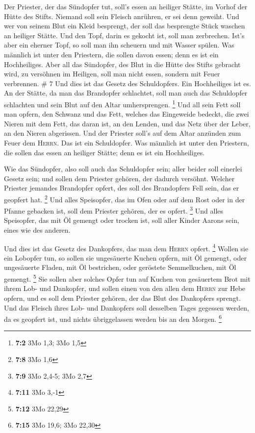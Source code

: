  Der Priester, der das Sündopfer tut, soll's essen an
heiliger Stätte, im Vorhof der Hütte des Stifts.  Niemand
soll sein Fleisch anrühren, er sei denn geweiht. Und wer von seinem Blut
ein Kleid besprengt, der soll das besprengte Stück waschen an heiliger
Stätte.  Und den Topf, darin es gekocht ist, soll man
zerbrechen. Ist's aber ein eherner Topf, so soll man ihn scheuern und
mit Wasser spülen.  Was männlich ist unter den Priestern,
die sollen davon essen; denn es ist ein Hochheiliges. 
Aber all das Sündopfer, des Blut in die Hütte des Stifts gebracht wird,
zu versöhnen im Heiligen, soll man nicht essen, sondern mit Feuer
verbrennen. \# 7  Und dies ist das Gesetz des
Schuldopfers. Ein Hochheiliges ist es.  An der Stätte, da
man das Brandopfer schlachtet, soll man auch das Schuldopfer schlachten
und sein Blut auf den Altar umhersprengen. \footnote{\textbf{7:2} 3Mo
  1,3; 3Mo 1,5}  Und all sein Fett soll man opfern, den
Schwanz und das Fett, welches das Eingeweide bedeckt,  die
zwei Nieren mit dem Fett, das daran ist, an den Lenden, und das Netz
über der Leber, an den Nieren abgerissen.  Und der
Priester soll's auf dem Altar anzünden zum Feuer dem \textsc{Herrn}. Das
ist ein Schuldopfer.  Was männlich ist unter den
Priestern, die sollen das essen an heiliger Stätte; denn es ist ein
Hochheiliges.

 Wie das Sündopfer, also soll auch das Schuldopfer sein;
aller beider soll einerlei Gesetz sein; und sollen dem Priester gehören,
der dadurch versöhnt.  Welcher Priester jemandes
Brandopfer opfert, des soll des Brandopfers Fell sein, das er geopfert
hat. \footnote{\textbf{7:8} 3Mo 1,6}  Und alles
Speisopfer, das im Ofen oder auf dem Rost oder in der Pfanne gebacken
ist, soll dem Priester gehören, der es opfert. \footnote{\textbf{7:9}
  3Mo 2,4-5; 3Mo 2,7}  Und alles Speisopfer, das mit Öl
gemengt oder trocken ist, soll aller Kinder Aarons sein, eines wie des
anderen.

 Und dies ist das Gesetz des Dankopfers, das man dem
\textsc{Herrn} opfert. \footnote{\textbf{7:11} 3Mo 3,-1} 
Wollen sie ein Lobopfer tun, so sollen sie ungesäuerte Kuchen opfern,
mit Öl gemengt, oder ungesäuerte Fladen, mit Öl bestrichen, oder
geröstete Semmelkuchen, mit Öl gemengt. \footnote{\textbf{7:12} 3Mo
  22,29}  Sie sollen aber solches Opfer tun auf Kuchen
von gesäuertem Brot mit ihrem Lob- und Dankopfer,  und
sollen einen von den allen dem \textsc{Herrn} zur Hebe opfern, und es
soll dem Priester gehören, der das Blut des Dankopfers sprengt.
 Und das Fleisch ihres Lob- und Dankopfers soll desselben
Tages gegessen werden, da es geopfert ist, und nichts übriggelassen
werden bis an den Morgen. \footnote{\textbf{7:15} 3Mo 19,6; 3Mo 22,30}

